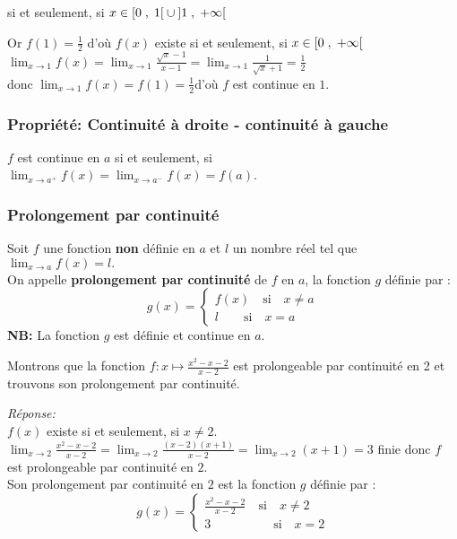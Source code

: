 \begin{example}
\begin{example}
si et seulement, si $x\in \left[0 \;,\; 1\right[\cup\left]1 \;,\; +\infty\right[$

Or $ f(1)= \frac{1}{2}$  d'où $ f(x) $ existe si et seulement, si  $x\in \left[0 \;,\; +\infty\right[  $ \\
$ \displaystyle\lim_{x \to 1}f(x)=\displaystyle\lim_{x \to 1}\frac{\sqrt{x}-1}{x-1}= \displaystyle\lim_{x \to 1}\frac{1}{\sqrt{x}+1}= \frac{1}{2}$ \\donc $\displaystyle \lim_{x \to 1}f(x)=f(1)=\frac{1}{2}$\quad d'où $ f $ est continue en $ 1. $
\end{example}

\subsubsection*{Propriété:  Continuité à droite - continuité à gauche}
\begin{property}
$ f $ est continue en $ a $ si et seulement, si  $\displaystyle \lim_{x \to a^{+}}f(x)=\displaystyle\lim_{x \to a^{-}}f(x)=f(a) $. 
\end{property}
\subsubsection*{Prolongement par continuité}
\begin{definition}
Soit $ f $ une fonction  \textbf{non}  définie en $ a $ et $ l $ un nombre réel tel que $ \displaystyle\lim_{x \to a}f(x)=l. $\\
On appelle \textbf{prolongement par continuité } de $ f $ en $ a $, la fonction $ g $ définie par :
\[ g (x)=\left\{\begin{array}{l} f(x)\quad \textrm{si} \quad x\neq a \\ l                      \quad \quad \textrm{si}\quad x= a  \end{array} \right.\]
\textbf{NB:} La fonction $ g $ est définie et continue en $ a $.
\end{definition}
\begin{example}
Montrons que la fonction $ f: x \mapsto \frac{x^{2}-x-2}{x-2} $   est prolongeable par continuité en 2 et trouvons son prolongement par continuité.
\end{example}

\textsl{Réponse:}\\
$ f(x) $ existe si et seulement, si $ x\neq 2 $.\\  $\displaystyle\lim_{x \to 2 }\frac{x^{2}-x-2}{x-2}=\displaystyle\lim_{x \to 2 }\frac{(x-2)(x+1)}{x-2}= \displaystyle\lim_{x \to 2 }(x+1)=3 $   finie donc $ f $ est prolongeable par continuité en $ 2. $\\
Son prolongement par continuité en $ 2$ est la fonction $ g $ définie par : 
\[ g (x)=\left\{\begin{array}{l} \frac{x^{2}-x-2}{x-2} \quad \textrm{si} \quad x\neq 2 \\ 3\quad \quad \qquad \quad  \textrm{si}\quad x= 2  \end{array} \right.\]


\end{example}
